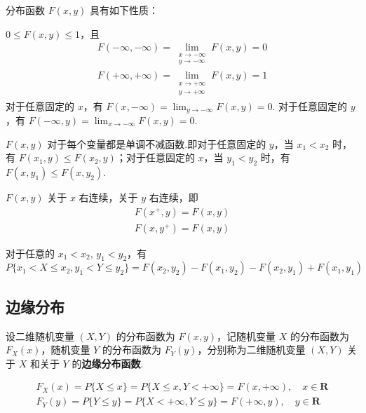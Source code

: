 分布函数 $F(x,y)$ 具有如下性质：

\begin{property}
    $0 \leqslant F(x,y) \leqslant 1$，且
    \begin{gather*}
        F(-\infty, -\infty) = \lim_{\substack{x \to -\infty \\ y \to -\infty}} F(x,y) = 0 \\
        F(+\infty, +\infty) = \lim_{\substack{x \to +\infty \\ y \to +\infty}} F(x,y) = 1
    \end{gather*}
    对于任意固定的 $x$，有 $F(x,-\infty) = \displaystyle\lim_{y \to -\infty} F(x,y) = 0$.\newline
    对于任意固定的 $y$，有 $F(-\infty,y) = \displaystyle\lim_{x \to -\infty} F(x,y) = 0$.
\end{property}

\begin{property}
    $F(x,y)$ 对于每个变量都是单调不减函数.即对于任意固定的 $y$，当 $x_1 < x_2$ 时，有 $F(x_1, y) \leqslant F(x_2, y)$；对于任意固定的 $x$，当 $y_1 < y_2$ 时，有 $F(x, y_1) \leqslant F(x, y_2)$.
\end{property}

\begin{property}
    $F(x,y)$ 关于 $x$ 右连续，关于 $y$ 右连续，即
    \begin{gather*}
        F(x^+, y) = F(x, y) \\
        F(x, y^+) = F(x, y)
    \end{gather*}
\end{property}

\begin{property}
    对于任意的 $x_1 < x_2, \, y_1 < y_2$，有
    $$
    P\{x_1 < X \leqslant x_2, y_1 < Y \leqslant y_2\} = F(x_2, y_2) - F(x_1, y_2) - F(x_2, y_1) + F(x_1, y_1)
    $$
\end{property}

\subsection{边缘分布}

\begin{definition}
    设二维随机变量 $(X,Y)$ 的分布函数为 $F(x,y)$，记随机变量 $X$ 的分布函数为 $F_{X}(x)$，随机变量 $Y$ 的分布函数为 $F_{Y}(y)$，分别称为二维随机变量 $(X,Y)$ 关于 $X$ 和关于 $Y$ 的\textbf{边缘分布函数}.
\end{definition}

\begin{gather*}
    F_{X}(x) = P\{X \leqslant x\} = P\{X \leqslant x, Y < +\infty\} = F(x, +\infty), \quad x \in \mathbf{R} \\
    F_{Y}(y) = P\{Y \leqslant y\} = P\{X < +\infty, Y \leqslant y\} = F(+\infty, y), \quad y \in \mathbf{R}
\end{gather*}

